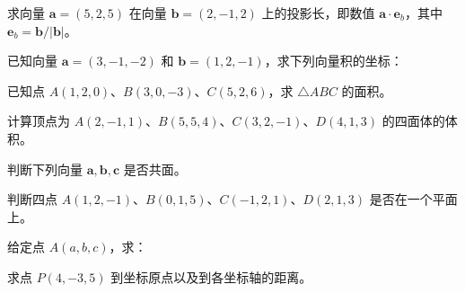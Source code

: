 \noindent\begin{minipage}{\textwidth}
求向量 $\mathbf a=(5,2,5)$ 在向量 $\mathbf b=(2,-1,2)$ 上的投影长，即数值 $\mathbf a\cdot\mathbf e_b$，其中 $\mathbf e_b=\mathbf b/|\mathbf b|$。
\end{minipage}\par\vfill
\newpage
\noindent\begin{minipage}{\textwidth}
已知向量 $\mathbf a=(3,-1,-2)$ 和 $\mathbf b=(1,2,-1)$，求下列向量积的坐标：
\end{minipage}\par\vfill
\noindent\begin{minipage}{\textwidth}
已知点 $A(1,2,0)$、$B(3,0,-3)$、$C(5,2,6)$，求 $\triangle ABC$ 的面积。
\end{minipage}\par\vfill
\noindent\begin{minipage}{\textwidth}
计算顶点为 $A(2,-1,1)$、$B(5,5,4)$、$C(3,2,-1)$、$D(4,1,3)$ 的四面体的体积。
\end{minipage}\par\vfill
\noindent\begin{minipage}{\textwidth}
判断下列向量 $\mathbf a,\mathbf b,\mathbf c$ 是否共面。
\end{minipage}\par\vfill
\newpage
\noindent\begin{minipage}{\textwidth}
判断四点 $A(1,2,-1)$、$B(0,1,5)$、$C(-1,2,1)$、$D(2,1,3)$ 是否在一个平面上。
\end{minipage}\par\vfill
\noindent\begin{minipage}{\textwidth}
给定点 $A(a,b,c)$，求：
\end{minipage}\par\vfill
\noindent\begin{minipage}{\textwidth}
求点 $P(4,-3,5)$ 到坐标原点以及到各坐标轴的距离。
\end{minipage}\par\vfill
